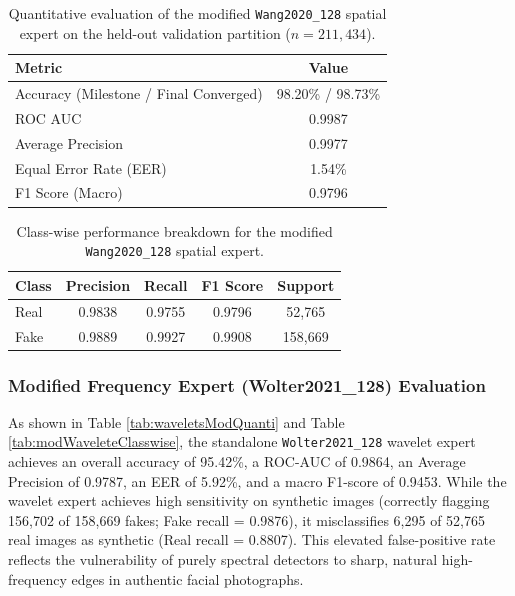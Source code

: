 \documentclass[fleqn,10pt]{wlscirep}
\begin{document}
\begin{table}[htbp]
\centering
\begin{tabular}{|l|c|}
\hline
\textbf{Metric} & \textbf{Value} \\
\hline
Accuracy (Milestone / Final Converged) & 98.20\% / 98.73\% \\
ROC AUC & 0.9987 \\
Average Precision & 0.9977 \\
Equal Error Rate (EER) & 1.54\% \\
F1 Score (Macro) & 0.9796 \\
\hline
\end{tabular}
\caption{\label{tab:wangModelModQuant}Quantitative evaluation of the modified \texttt{Wang2020\_128} spatial expert on the held-out validation partition ($n=211{,}434$).}
\end{table}

\begin{table}[htbp]
\centering
\begin{tabular}{|l|c|c|c|c|}
\hline
\textbf{Class} & \textbf{Precision} & \textbf{Recall} & \textbf{F1 Score} & \textbf{Support} \\
\hline
Real & 0.9838 & 0.9755 & 0.9796 & 52,765 \\
Fake & 0.9889 & 0.9927 & 0.9908 & 158,669 \\
\hline
\end{tabular}
\caption{\label{tab:wangModClassWise}Class-wise performance breakdown for the modified \texttt{Wang2020\_128} spatial expert.}
\end{table}

\subsubsection*{Modified Frequency Expert (Wolter2021\_128) Evaluation}
As shown in Table \ref{tab:waveletsModQuanti} and Table \ref{tab:modWaveleteClasswise}, the standalone \texttt{Wolter2021\_128} wavelet expert achieves an overall accuracy of 95.42\%, a ROC-AUC of 0.9864, an Average Precision of 0.9787, an EER of 5.92\%, and a macro F1-score of 0.9453. While the wavelet expert achieves high sensitivity on synthetic images (correctly flagging 156,702 of 158,669 fakes; Fake recall = 0.9876), it misclassifies 6,295 of 52,765 real images as synthetic (Real recall = 0.8807). This elevated false-positive rate reflects the vulnerability of purely spectral detectors to sharp, natural high-frequency edges in authentic facial photographs.
\end{document}
